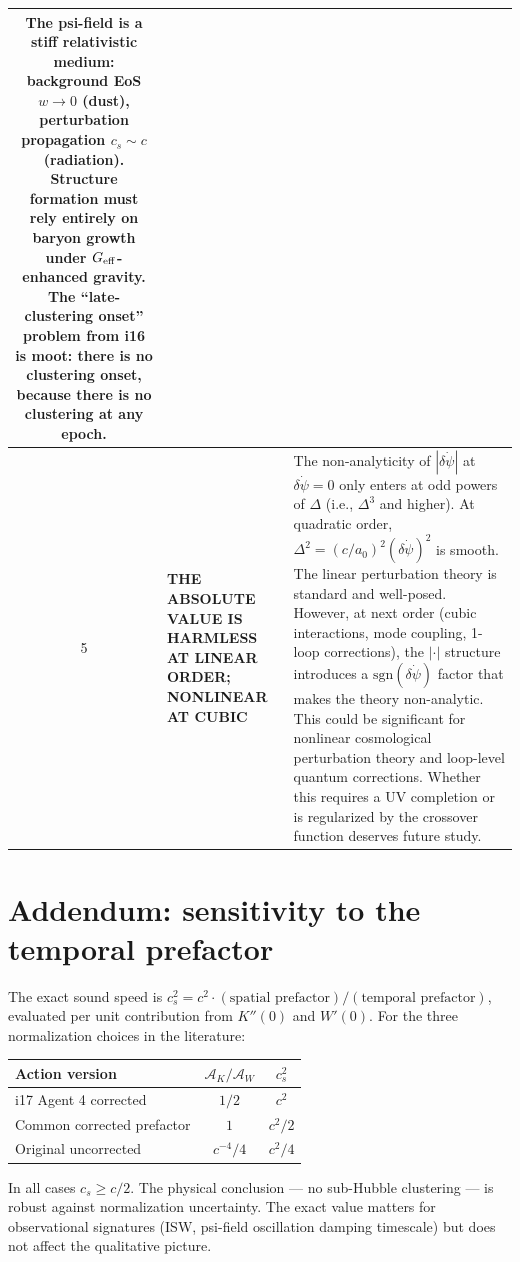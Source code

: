 \documentclass[aps,prd,twocolumn,nofootinbib]{revtex4-2}
\newcommand{\aM}{a_0}
\begin{document}
\begin{table}[t]
\begin{tabular}{@{}clp{11cm}@{}}
  The psi-field is a \textbf{stiff relativistic medium}: background EoS
  $w \to 0$ (dust), perturbation propagation $c_s \sim c$ (radiation).
  Structure formation must rely entirely on baryon growth under
  $G_{\rm eff}$-enhanced gravity. The ``late-clustering onset'' problem
  from i16 is moot: there is no clustering onset, because there is no
  clustering at any epoch. \\
\midrule
5 & \textbf{THE ABSOLUTE VALUE IS HARMLESS AT LINEAR ORDER; NONLINEAR AT CUBIC} &
  The non-analyticity of $|\delta\dot\psi|$ at $\delta\dot\psi = 0$ only
  enters at odd powers of $\Delta$ (i.e., $\Delta^3$ and higher). At
  quadratic order, $\Delta^2 = (c/\aM)^2(\delta\dot\psi)^2$ is smooth.
  The linear perturbation theory is standard and well-posed. However,
  at next order (cubic interactions, mode coupling, 1-loop corrections),
  the $|\cdot|$ structure introduces a $\text{sgn}(\delta\dot\psi)$
  factor that makes the theory non-analytic. This could be significant
  for nonlinear cosmological perturbation theory and loop-level
  quantum corrections. Whether this requires a UV completion or is
  regularized by the crossover function deserves future study. \\
\bottomrule
\end{tabular}
\end{table}

\section*{Addendum: sensitivity to the temporal prefactor}

The exact sound speed is $c_s^2 = c^2 \cdot (\text{spatial prefactor})
/(\text{temporal prefactor})$, evaluated per unit contribution from
$K''(0)$ and $W'(0)$. For the three normalization choices in the
literature:

\begin{center}
\begin{tabular}{lcc}
\toprule
Action version & $\mathcal{A}_K/\mathcal{A}_W$ & $c_s^2$ \\
\midrule
i17 Agent 4 corrected & $1/2$ & $c^2$ \\
Common corrected prefactor & $1$ & $c^2/2$ \\
Original uncorrected & $c^{-4}/4$ & $c^2/4$ \\
\bottomrule
\end{tabular}
\end{center}

In all cases $c_s \geq c/2$. The physical conclusion --- no sub-Hubble
clustering --- is robust against normalization uncertainty. The exact
value matters for observational signatures (ISW, psi-field oscillation
damping timescale) but does not affect the qualitative picture.
\end{document}
